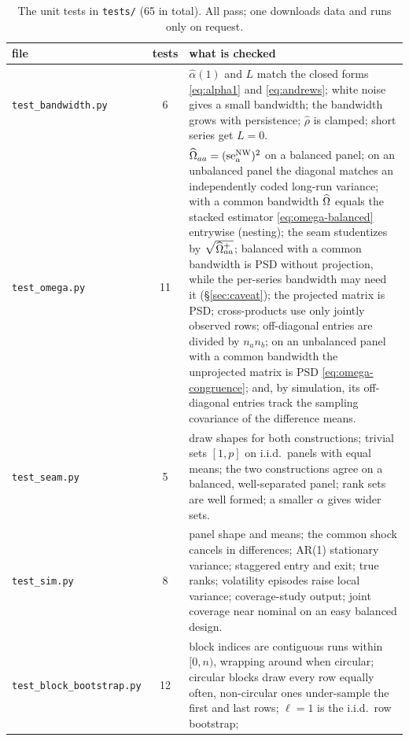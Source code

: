 \begin{table}[htb]
  \centering
  \caption[Unit tests]{The unit tests in \texttt{tests/} (65 in total). All pass; one
  downloads data and runs only on request.}
  \label{tab:impl-tests}
  \small
  \begin{tabular}{lcp{9.6cm}}
    \toprule
    file & tests & what is checked\\
    \midrule
    \texttt{test\_bandwidth.py} & 6
      & $\hat\alpha(1)$ and $L$ match the closed forms \eqref{eq:alpha1} and
        \eqref{eq:andrews}; white noise gives a small bandwidth; the bandwidth
        grows with persistence; $\hat\rho$ is clamped; short series get $L=0$.\\
    \texttt{test\_omega.py} & 11
      & $\widehat{\Omega}_{aa}=(\mathrm{se}^{\mathrm{NW}}_{a})^2$ on a balanced panel; on an unbalanced panel
        the diagonal matches an independently coded long-run variance; with a
        common bandwidth $\widehat{\Omega}$ equals the stacked estimator
        \eqref{eq:omega-balanced} entrywise (nesting); the seam studentizes by
        $\sqrt{\widehat{\Omega}^{+}_{aa}}$; balanced with a common bandwidth is PSD
        without projection, while the per-series bandwidth may need it
        (\S\ref{sec:caveat}); the projected matrix is PSD; cross-products use
        only jointly observed rows; off-diagonal entries are divided by $n_a n_b$;
        on an unbalanced panel with a common bandwidth the unprojected matrix is
        PSD \eqref{eq:omega-congruence}; and, by simulation, its off-diagonal entries
        track the sampling covariance of the difference means.\\
    \texttt{test\_seam.py} & 5
      & draw shapes for both constructions; trivial sets $[1,p]$ on i.i.d.\
        panels with equal means; the two constructions agree on a balanced,
        well-separated panel; rank sets are well formed; a smaller $\alpha$
        gives wider sets.\\
    \texttt{test\_sim.py} & 8
      & panel shape and means; the common shock cancels in differences; AR(1)
        stationary variance; staggered entry and exit; true ranks; volatility
        episodes raise local variance; coverage-study output; joint coverage near
        nominal on an easy balanced design.\\
    \texttt{test\_block\_bootstrap.py} & 12
      & block indices are contiguous runs within $[0,n)$, wrapping around when
        circular; circular blocks draw every row equally often, non-circular ones
        under-sample the first and last rows; $\ell=1$ is the i.i.d.\ row bootstrap;

\end{tabular}
\end{table}
